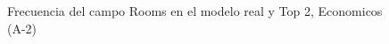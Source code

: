 \begin{figure}[H]
    \centering
    
    \caption{Frecuencia del campo Rooms en el modelo real y Top 2, Economicos (A-2)}
    \label{frecuency-Rooms-top2}
\end{figure}